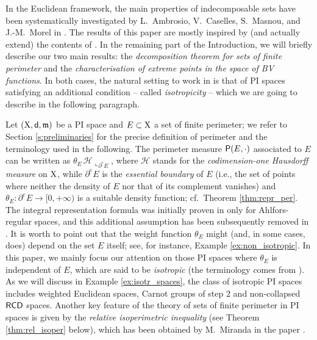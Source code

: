 \documentclass[reqno]{amsart}
\numberwithin{equation}{section}
\newcommand{\X}{{\rm X}}
\newcommand{\sfd}{{\sf d}}
\newcommand{\mm}{\mathfrak m}
\newcommand{\1}{\mathbbm 1}
\renewcommand{\P}{{\sf P}}
\renewcommand{\H}{{\mathcal H}}
\begin{document}
In the Euclidean framework, the main properties of indecomposable sets have
been systematically investigated by L.\ Ambrosio, V.\ Caselles, S.\ Masnou,
and J.-M.\ Morel in \cite{ACMM01}. The results of this paper are mostly
inspired by (and actually extend) the contents of \cite{ACMM01}.
In the remaining part of the Introduction, we will briefly describe our
two main results: the \emph{decomposition theorem for sets of finite perimeter}
and the \emph{characterisation of extreme points in the space of BV functions}.
In both cases, the natural setting to work in is that of PI spaces satisfying an
additional condition -- called \emph{isotropicity} -- which we are going to describe
in the following paragraph.
%
%
\medskip

Let \((\X,\sfd,\mm)\) be a PI space and \(E\subset\X\) a set of finite perimeter;
we refer to Section \ref{s:preliminaries} for the precise definition of perimeter
and the terminology used in the following. The perimeter measure \(\P(E,\cdot)\)
associated to \(E\) can be written as \(\theta_E\,\H\llcorner_{\partial^e E}\),
where \(\H\) stands for the \emph{codimension-one Hausdorff measure} on \(\X\),
while \(\partial^e E\) is the \emph{essential boundary} of \(E\) (i.e.,
the set of points where neither the density of \(E\) nor that of its
complement vanishes) and \(\theta_E\colon\partial^e E\to[0,+\infty)\)
is a suitable density function; cf.\ Theorem \ref{thm:repr_per}.
The integral representation formula was initially proven in \cite{Ambrosio01}
only for Ahlfors-regular spaces, and this additional assumption has been
subsequently removed in \cite{Ambrosio02}. It is worth to point out that the
weight function \(\theta_E\) might (and, in some cases, does) depend on the set \(E\)
itself; see, for instance, Example \ref{ex:non_isotropic}. In this paper,
we mainly focus our attention on those PI spaces where \(\theta_E\) is
independent of \(E\), which are said to be \emph{isotropic} (the terminology
comes from \cite{AMP04}). As we will discuss in Example \ref{ex:isotr_spaces},
the class of isotropic PI spaces includes weighted Euclidean spaces, Carnot
groups of step \(2\) and non-collapsed \(\sf RCD\) spaces. Another key feature
of the theory of sets of finite perimeter in PI spaces is given by the
\emph{relative isoperimetric inequality} (see Theorem \ref{thm:rel_isoper}
below), which has been obtained by M.\ Miranda in the paper \cite{Miranda03}.
\end{document}
